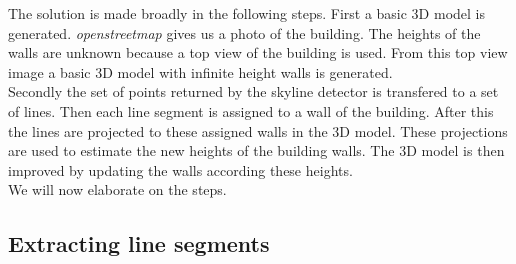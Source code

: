 \documentclass[10pt]{article}
\begin{document}
The solution is made broadly in the following steps. 
First a basic 3D model is generated. \emph{openstreetmap} gives us a photo of the
building.  The heights of the walls are unknown because a top view of the
building is used.  From this top view image a basic 3D model with infinite
height walls is generated.\\
Secondly the set of points returned by the skyline detector is transfered to a set of
lines. Then each line segment is assigned to a wall of the building. After this 
the lines are projected to these assigned walls in the 3D model. 
These projections are used to estimate the new heights of the building walls.
The 3D model is then improved by updating the walls according these heights. \\
We will now elaborate on the steps.





\subsection{Extracting line segments}
%
\end{document}
